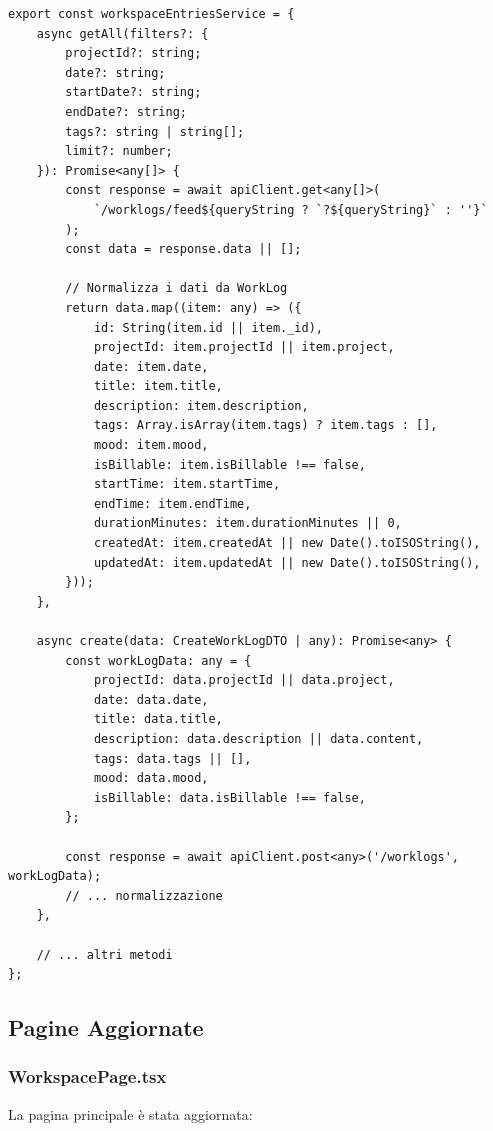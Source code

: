 \documentclass[11pt,a4paper]{article}
\begin{document}
\begin{lstlisting}[caption=workspaceService Aggiornato]
export const workspaceEntriesService = {
    async getAll(filters?: {
        projectId?: string;
        date?: string;
        startDate?: string;
        endDate?: string;
        tags?: string | string[];
        limit?: number;
    }): Promise<any[]> {
        const response = await apiClient.get<any[]>(
            `/worklogs/feed${queryString ? `?${queryString}` : ''}`
        );
        const data = response.data || [];
        
        // Normalizza i dati da WorkLog
        return data.map((item: any) => ({
            id: String(item.id || item._id),
            projectId: item.projectId || item.project,
            date: item.date,
            title: item.title,
            description: item.description,
            tags: Array.isArray(item.tags) ? item.tags : [],
            mood: item.mood,
            isBillable: item.isBillable !== false,
            startTime: item.startTime,
            endTime: item.endTime,
            durationMinutes: item.durationMinutes || 0,
            createdAt: item.createdAt || new Date().toISOString(),
            updatedAt: item.updatedAt || new Date().toISOString(),
        }));
    },
    
    async create(data: CreateWorkLogDTO | any): Promise<any> {
        const workLogData: any = {
            projectId: data.projectId || data.project,
            date: data.date,
            title: data.title,
            description: data.description || data.content,
            tags: data.tags || [],
            mood: data.mood,
            isBillable: data.isBillable !== false,
        };
        
        const response = await apiClient.post<any>('/worklogs', workLogData);
        // ... normalizzazione
    },
    
    // ... altri metodi
};
\end{lstlisting}

\subsection{Pagine Aggiornate}

\subsubsection{WorkspacePage.tsx}

La pagina principale è stata aggiornata:
\end{document}
